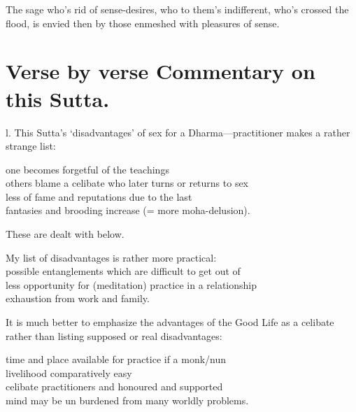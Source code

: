 \begin{MyDescription}{}
The sage who's rid of sense-desires,
who to them's indifferent,
who's crossed the flood, is envied then
by those enmeshed with pleasures of sense.
\end{MyDescription}

\begin{MyDescription}[(Sn. 814-823)]{}

\end{MyDescription}

\section{Verse by verse Commentary on this Sutta.}

\begin{enumerate}


l. This Sutta's `disadvantages' of sex for a Dharma—practitioner makes a rather strange list:
\begin{MyDescription}[]{}
one becomes forgetful of the teachings\\
others blame a celibate who later turns or returns to sex\\
less of fame and reputations due to the last\\
fantasies and brooding increase (= more moha-delusion).
\end{MyDescription}

These are dealt with below.

\begin{MyDescription}[]{}
My list of disadvantages is rather more practical:\\
possible entanglements which are difficult to get out of\\
less opportunity for (meditation) practice in a relationship\\
exhaustion from work and family.
\end{MyDescription}

It is much better to emphasize the advantages of the Good Life as a celibate rather than listing supposed or real disadvantages: 

\begin{MyDescription}[]{}
time and place available for practice if a monk/nun\\
livelihood comparatively easy\\
celibate practitioners and honoured and supported\\
mind may be un burdened from many worldly problems.
\end{MyDescription}


\end{enumerate}
